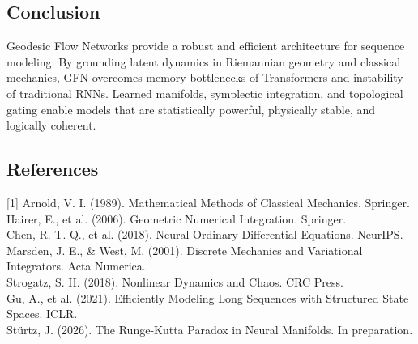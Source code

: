 \documentclass{article}
\numberwithin{equation}{section}
\begin{document}
\subsection{Conclusion}
Geodesic Flow Networks provide a robust and efficient architecture for sequence modeling. By grounding latent dynamics in Riemannian geometry and classical mechanics, GFN overcomes memory bottlenecks of Transformers and instability of traditional RNNs. Learned manifolds, symplectic integration, and topological gating enable models that are statistically powerful, physically stable, and logically coherent.

\subsection*{References}
[1] Arnold, V. I. (1989). Mathematical Methods of Classical Mechanics. Springer.\\
[2] Hairer, E., et al. (2006). Geometric Numerical Integration. Springer.\\
[3] Chen, R. T. Q., et al. (2018). Neural Ordinary Differential Equations. NeurIPS.\\
[4] Marsden, J. E., \& West, M. (2001). Discrete Mechanics and Variational Integrators. Acta Numerica.\\
[5] Strogatz, S. H. (2018). Nonlinear Dynamics and Chaos. CRC Press.\\
[6] Gu, A., et al. (2021). Efficiently Modeling Long Sequences with Structured State Spaces. ICLR.\\
[7] Stürtz, J. (2026). The Runge-Kutta Paradox in Neural Manifolds. In preparation.
\end{document}
